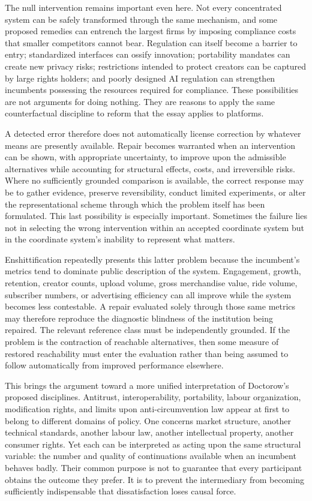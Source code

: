 \documentclass[11pt]{article}
\begin{document}
The null intervention remains important even here. Not every concentrated system can be safely transformed through the same mechanism, and some proposed remedies can entrench the largest firms by imposing compliance costs that smaller competitors cannot bear. Regulation can itself become a barrier to entry; standardized interfaces can ossify innovation; portability mandates can create new privacy risks; restrictions intended to protect creators can be captured by large rights holders; and poorly designed AI regulation can strengthen incumbents possessing the resources required for compliance. These possibilities are not arguments for doing nothing. They are reasons to apply the same counterfactual discipline to reform that the essay applies to platforms.

A detected error therefore does not automatically license correction by whatever means are presently available. Repair becomes warranted when an intervention can be shown, with appropriate uncertainty, to improve upon the admissible alternatives while accounting for structural effects, costs, and irreversible risks. Where no sufficiently grounded comparison is available, the correct response may be to gather evidence, preserve reversibility, conduct limited experiments, or alter the representational scheme through which the problem itself has been formulated. This last possibility is especially important. Sometimes the failure lies not in selecting the wrong intervention within an accepted coordinate system but in the coordinate system's inability to represent what matters.

Enshittification repeatedly presents this latter problem because the incumbent's metrics tend to dominate public description of the system. Engagement, growth, retention, creator counts, upload volume, gross merchandise value, ride volume, subscriber numbers, or advertising efficiency can all improve while the system becomes less contestable. A repair evaluated solely through those same metrics may therefore reproduce the diagnostic blindness of the institution being repaired. The relevant reference class must be independently grounded. If the problem is the contraction of reachable alternatives, then some measure of restored reachability must enter the evaluation rather than being assumed to follow automatically from improved performance elsewhere.

This brings the argument toward a more unified interpretation of Doctorow's proposed disciplines. Antitrust, interoperability, portability, labour organization, modification rights, and limits upon anti-circumvention law appear at first to belong to different domains of policy. One concerns market structure, another technical standards, another labour law, another intellectual property, another consumer rights. Yet each can be interpreted as acting upon the same structural variable: the number and quality of continuations available when an incumbent behaves badly. Their common purpose is not to guarantee that every participant obtains the outcome they prefer. It is to prevent the intermediary from becoming sufficiently indispensable that dissatisfaction loses causal force.
\end{document}
